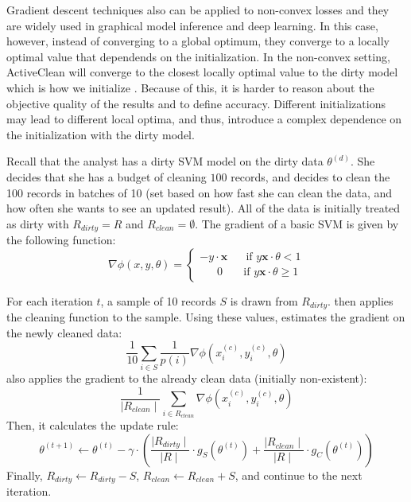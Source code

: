 Gradient descent techniques also can be applied to non-convex losses and they are widely used in graphical model inference and deep learning. In this case, however, instead of converging to a global optimum, they converge to a locally optimal value that dependends on the initialization.
In the non-convex setting, ActiveClean will converge to the closest locally optimal value to
the dirty model which is how we initialize \sys. Because of this, it is harder to reason about
the objective quality of the results and to define accuracy.
 Different initializations may lead to different local
optima, and thus, introduce a complex dependence on the
initialization with the dirty model.

\begin{example}\label{upex}
Recall that the analyst has a dirty SVM model on the dirty data $\theta^{(d)}$.
She decides that she has a budget of cleaning $100$ records, and decides to clean the 100 records in batches of 10 (set based on how fast she can clean the data, and how often she wants to see an updated result).
All of the data is initially treated as dirty with $R_{dirty} = R$ and $R_{clean} = \emptyset$.
The gradient of a basic SVM is given by the following function:
\[
\nabla\phi(x,y,\theta) =
\begin{cases}      
-y\cdot\boldsymbol{x} ~~~~~~ \text{ if } y\boldsymbol{x}\cdot\theta < 1 \\
~~~~~~~0\ ~~~~~~\text{ if } y\boldsymbol{x}\cdot\theta \geq 1      
\end{cases}
\]

For each iteration $t$, a sample of 10 records $S$ is drawn from $R_{dirty}$.
\sys then applies the cleaning function to the sample.
Using these values, \sys estimates the gradient on the newly cleaned data:
\[
\frac{1}{10} \sum_{i \in S}\frac{1}{p(i)}\nabla\phi(x_i^{(c)},y_i^{(c)},\theta)
\]
\sys also applies the gradient to the already clean data (initially non-existent):
\[
\frac{1}{\mid R_{clean}\mid}\sum_{i \in R_{clean}}\nabla\phi(x_i^{(c)},y_i^{(c)},\theta)
\]
Then, it calculates the update rule:
\[
	\theta^{(t+1)} \leftarrow \theta^{(t)} - \gamma \cdot(\frac{\mid R_{dirty} \mid}{\mid R \mid} \cdot g_S(\theta^{(t)}) + \frac{\mid R_{clean} \mid}{\mid R \mid} \cdot  g_C(\theta^{(t)}))
\] 
Finally, $R_{dirty} \leftarrow R_{dirty} - S$, $R_{clean} \leftarrow R_{clean} + S$, and continue to the next iteration.
\end{example}

